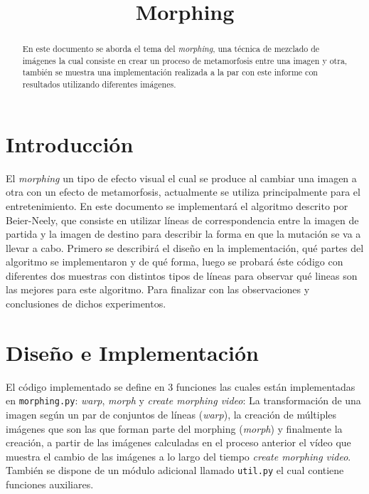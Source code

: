 \documentclass[conference]{IEEEtran}
\begin{document}
\title{Morphing}
\author{
}


\maketitle

\begin{abstract}
	En este documento se aborda el tema del \textit{morphing}, una técnica de mezclado de imágenes la cual consiste en crear un proceso de metamorfosis entre una imagen y otra, también se muestra una implementación realizada a la par con este informe con resultados utilizando diferentes imágenes.
\end{abstract}
 

\section*{Introducción} %
	El \textit{morphing} un tipo de efecto visual el cual se produce al cambiar una imagen a otra con un efecto de metamorfosis, actualmente se utiliza principalmente para el entretenimiento. En este documento se implementará el algoritmo descrito por Beier-Neely\cite{Paper}, que consiste en utilizar líneas de correspondencia entre la imagen de partida y la imagen de destino para describir la forma en que la mutación se va a llevar a cabo. Primero se describirá el diseño en la implementación, qué partes del algoritmo se implementaron y de qué forma, luego se probará éste código con diferentes dos muestras con distintos tipos de líneas para observar qué lineas son las mejores para este algoritmo. Para finalizar con las observaciones y conclusiones de dichos experimentos.
	
	
\section*{Diseño e Implementación}
	El código implementado se define en 3 funciones las cuales están implementadas en \texttt{morphing.py}: \textit{warp}, \textit{morph} y \textit{create morphing video}: La transformación de una imagen según un par de conjuntos de líneas (\textit{warp}), la creación de múltiples imágenes que son las que forman parte del morphing (\textit{morph}) y finalmente la creación, a partir de las imágenes calculadas en el proceso anterior el vídeo que muestra el cambio de las imágenes a lo largo del tiempo \textit{create morphing video}. También se dispone de un módulo adicional llamado \texttt{util.py} el cual contiene funciones auxiliares.
	
\end{document}
